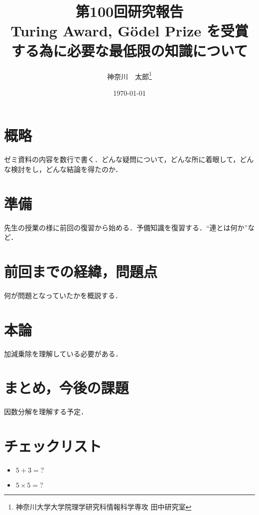 \documentclass[10pt,twocolumn]{jarticle}
\title{第100回研究報告 \\ Turing Award, G\"{o}del Prize を受賞する為に必要な最低限の知識について}
\author{神奈川　太郎\if0\thanks{神奈川大学大学院理学研究科情報科学専攻 田中研究室}\fi}
\date{\today}
\begin{document}
\maketitle
\thispagestyle{empty}

%
%
%
%
%
%

% 

\section{概略}
\noindent ゼミ資料の内容を数行で書く．どんな疑問について，どんな所に着眼して，どんな検討をし，どんな結論を得たのか．

\section{準備}
\noindent 先生の授業の様に前回の復習から始める．予備知識を復習する．``連とは何か''など．

\section{前回までの経緯，問題点}
\noindent 何が問題となっていたかを概説する．

\section{本論}
加減乗除を理解している必要がある．

\section{まとめ，今後の課題}
因数分解を理解する予定．

\par

{\small
 
 
}

\section{チェックリスト}
\begin{itemize}
\item $5 + 3 = ?$
\item $5 \times 5 = ?$
\end{itemize}
\end{document}
